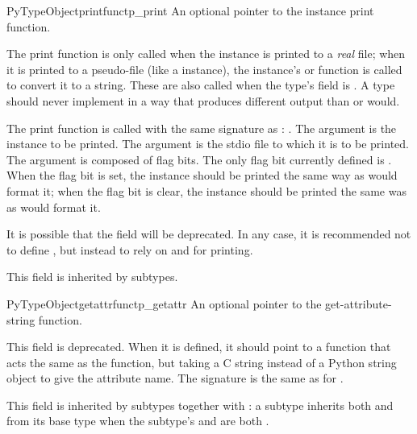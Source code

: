 \begin{cmemberdesc}{PyTypeObject}{printfunc}{tp_print}
  An optional pointer to the instance print function.

  The print function is only called when the instance is printed to a
  \emph{real} file; when it is printed to a pseudo-file (like a
   instance), the instance's  or
   function is called to convert it to a string.  These
  are also called when the type's  field is \NULL.  A
  type should never implement  in a way that produces
  different output than  or  would.

  The print function is called with the same signature as
  : .  The  argument is the instance to be
  printed.  The  argument is the stdio file to which it is
  to be printed.  The  argument is composed of flag bits.
  The only flag bit currently defined is .
  When the  flag bit is set, the instance
  should be printed the same way as  would format it;
  when the  flag bit is clear, the instance
  should be printed the same was as  would format it.

  It is possible that the  field will be deprecated.
  In any case, it is recommended not to define , but
  instead to rely on  and  for
  printing.

  This field is inherited by subtypes.
\end{cmemberdesc}

\begin{cmemberdesc}{PyTypeObject}{getattrfunc}{tp_getattr}
  An optional pointer to the get-attribute-string function.

  This field is deprecated.  When it is defined, it should point to a
  function that acts the same as the  function,
  but taking a C string instead of a Python string object to give the
  attribute name.  The signature is the same as for
  .

  This field is inherited by subtypes together with
  : a subtype inherits both 
  and  from its base type when the subtype's
   and  are both \NULL.
\end{cmemberdesc}


